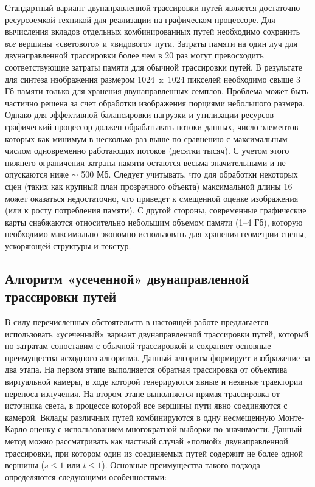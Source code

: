 Стандартный вариант двунаправленной трассировки путей является достаточно ресурсоемкой техникой для реализации на графическом процессоре. Для вычисления вкладов отдельных комбинированных путей необходимо сохранить \textit{все} вершины «светового» и «видового» пути. Затраты памяти на один луч для двунаправленной трассировки более чем в 20 раз могут превосходить соответствующие затраты памяти для обычной трассировки путей. В результате для синтеза изображения размером 1024 x 1024 пикселей необходимо свыше 3 Гб памяти только для хранения двунаправленных семплов. Проблема может быть частично решена за счет обработки изображения порциями небольшого размера. Однако для эффективной балансировки нагрузки и утилизации ресурсов графический процессор должен обрабатывать потоки данных, число элементов которых как минимум в несколько раз выше по сравнению с максимальным числом одновременно работающих потоков (десятки тысяч). С учетом этого нижнего ограничения затраты памяти остаются весьма значительными и не опускаются ниже $\sim$ 500 Мб. Следует учитывать, что для обработки некоторых сцен (таких как крупный план прозрачного объекта) максимальной длины 16 может оказаться недостаточно, что приведет к смещенной оценке изображения (или к росту потребления памяти). С другой стороны, современные графические карты снабжаются относительно небольшим объемом памяти (1–4 Гб), которую необходимо максимально экономно использовать для хранения геометрии сцены, ускоряющей структуры и текстур.

\subsection{Алгоритм «усеченной» двунаправленной трассировки путей}

В силу перечисленных обстоятельств в настоящей работе предлагается использовать «усеченный» вариант двунаправленной трассировки путей, который по затратам сопоставим с обычной трассировкой и сохраняет основные преимущества исходного алгоритма. Данный алгоритм формирует изображение за два этапа. На первом этапе выполняется обратная трассировка от объектива виртуальной камеры, в ходе которой генерируются явные и неявные траектории переноса излучения. На втором этапе выполняется прямая трассировка от источника света, в процессе которой все вершины пути явно соединяются с камерой. Вклады различных путей комбинируются в одну несмещенную Монте-Карло оценку с использованием многократной выборки по значимости. Данный метод можно рассматривать как частный случай «полной» двунаправленной трассировки, при котором один из соединяемых путей содержит не более одной вершины ($s \le 1$ или $t \le 1$). Основные преимущества такого подхода определяются следующими особенностями:


